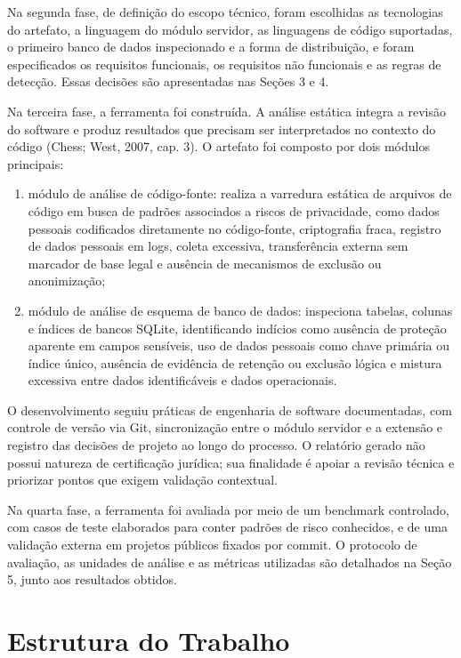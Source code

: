 \documentclass[12pt,a4paper,oneside]{report}
\newcommand{\secaointro}[1]{\section*{#1}\addcontentsline{toc}{section}{#1}}
\begin{document}
Na segunda fase, de definição do escopo técnico, foram escolhidas as tecnologias do artefato, a linguagem do módulo servidor, as linguagens de código suportadas, o primeiro banco de dados inspecionado e a forma de distribuição, e foram especificados os requisitos funcionais, os requisitos não funcionais e as regras de detecção. Essas decisões são apresentadas nas Seções 3 e 4.

Na terceira fase, a ferramenta foi construída. A análise estática integra a revisão do software e produz resultados que precisam ser interpretados no contexto do código (Chess; West, 2007, cap. 3). O artefato foi composto por dois módulos principais:

\begin{enumerate}
\item módulo de análise de código-fonte: realiza a varredura estática de arquivos de código em busca de padrões associados a riscos de privacidade, como dados pessoais codificados diretamente no código-fonte, criptografia fraca, registro de dados pessoais em logs, coleta excessiva, transferência externa sem marcador de base legal e ausência de mecanismos de exclusão ou anonimização;
\item módulo de análise de esquema de banco de dados: inspeciona tabelas, colunas e índices de bancos SQLite, identificando indícios como ausência de proteção aparente em campos sensíveis, uso de dados pessoais como chave primária ou índice único, ausência de evidência de retenção ou exclusão lógica e mistura excessiva entre dados identificáveis e dados operacionais.
\end{enumerate}

O desenvolvimento seguiu práticas de engenharia de software documentadas, com controle de versão via Git, sincronização entre o módulo servidor e a extensão e registro das decisões de projeto ao longo do processo. O relatório gerado não possui natureza de certificação jurídica; sua finalidade é apoiar a revisão técnica e priorizar pontos que exigem validação contextual.

Na quarta fase, a ferramenta foi avaliada por meio de um benchmark controlado, com casos de teste elaborados para conter padrões de risco conhecidos, e de uma validação externa em projetos públicos fixados por commit. O protocolo de avaliação, as unidades de análise e as métricas utilizadas são detalhados na Seção 5, junto aos resultados obtidos.

\secaointro{Estrutura do Trabalho}
\end{document}
